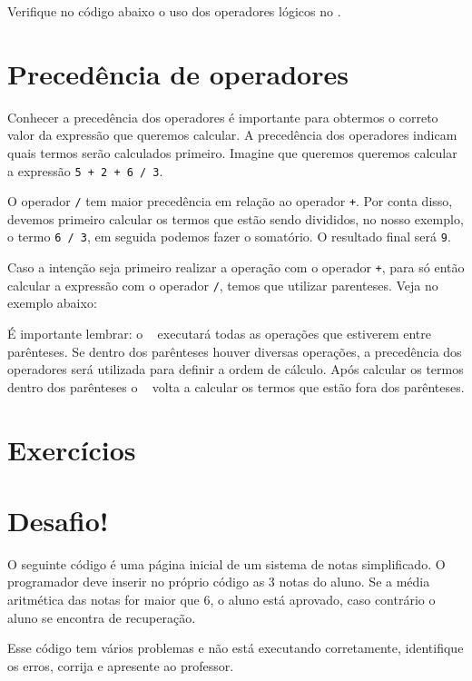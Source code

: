 

Verifique no código abaixo o uso dos operadores lógicos no \php.



\section{Precedência de operadores}
\label{precedencia-de-operadores}

Conhecer a precedência dos operadores é importante para obtermos o correto
valor da expressão que queremos calcular. A precedência dos operadores indicam quais
termos serão calculados primeiro. Imagine que queremos queremos calcular a
expressão \texttt{5 + 2 + 6 / 3}. 

O operador \texttt{/} tem maior precedência em relação ao operador \texttt{+}.
Por conta disso, devemos primeiro calcular os termos que estão sendo divididos, 
no nosso exemplo, o termo \texttt{6 / 3}, em seguida podemos fazer o somatório. 
O resultado final será \texttt{9}.

Caso a intenção seja primeiro realizar a operação com o operador \texttt{+}, para
só então calcular a expressão com o operador \texttt{/}, temos que utilizar
parenteses. Veja no exemplo abaixo:



É importante lembrar: o \php~ executará todas as operações que estiverem
entre parênteses. Se dentro dos parênteses houver diversas operações, a precedência
dos operadores será utilizada para definir a ordem de cálculo. Após calcular
os termos dentro dos parênteses o \php~ volta a calcular os termos que estão
fora dos parênteses.

\section{Exercícios}
\label{cap4-exercicios}

\section{Desafio!}
\label{cap4-desafio}
O seguinte código é uma página inicial de um sistema de notas simplificado.
O programador deve inserir no próprio código as 3 notas do aluno. Se a média aritmética 
das notas for maior que 6, o aluno está aprovado, caso contrário o aluno se encontra de 
recuperação.

Esse código tem vários problemas e não está executando corretamente, identifique os erros, 
corrija e apresente ao professor.

